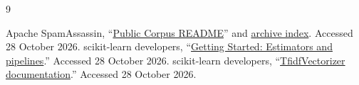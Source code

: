 \begin{thebibliography}{9}
 Apache SpamAssassin, ``\href{https://spamassassin.apache.org/old/publiccorpus/readme.html}{Public Corpus README}'' and \href{https://spamassassin.apache.org/old/publiccorpus/}{archive index}. Accessed 28 October 2026.
 scikit-learn developers, ``\href{https://scikit-learn.org/stable/getting_started.html}{Getting Started: Estimators and pipelines}.'' Accessed 28 October 2026.
 scikit-learn developers, ``\href{https://scikit-learn.org/stable/modules/generated/sklearn.feature_extraction.text.TfidfVectorizer.html}{TfidfVectorizer documentation}.'' Accessed 28 October 2026.
\end{thebibliography}
